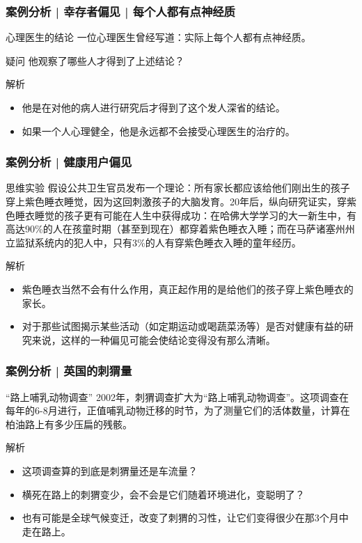 \begin{frame}
  \frametitle{案例分析 | 幸存者偏见 | 每个人都有点神经质}
  \begin{block}{心理医生的结论}
    一位心理医生曾经写道：实际上每个人都有点神经质。
  \end{block}
  \pause
  \begin{block}{疑问}
    他观察了哪些人才得到了上述结论？
  \end{block}
  \pause
  \begin{block}{解析}
    \begin{itemize}
      \item 他是在对他的病人进行研究后才得到了这个发人深省的结论。
      \item 如果一个人心理健全，他是永远都不会接受心理医生的治疗的。
    \end{itemize}
  \end{block}
\end{frame}

\begin{frame}
  \frametitle{案例分析 | 健康用户偏见}
   \begin{block}{思维实验}
     假设公共卫生官员发布一个理论：所有家长都应该给他们刚出生的孩子穿上紫色睡衣睡觉，因为这回刺激孩子的大脑发育。20年后，纵向研究证实，穿紫色睡衣睡觉的孩子更有可能在人生中获得成功：在哈佛大学学习的大一新生中，有高达90\%的人在孩童时期（甚至到现在）都穿着紫色睡衣入睡；而在马萨诸塞州州立监狱系统内的犯人中，只有3\%的人有穿紫色睡衣入睡的童年经历。
   \end{block} 
   \pause
   \begin{block}{解析}
     \begin{itemize}
       \item 紫色睡衣当然不会有什么作用，真正起作用的是给他们的孩子穿上紫色睡衣的家长。
       \item 对于那些试图揭示某些活动（如定期运动或喝蔬菜汤等）是否对健康有益的研究来说，这样的一种偏见可能会使结论变得没有那么清晰。
     \end{itemize}
   \end{block}
\end{frame}

\begin{frame}
  \frametitle{案例分析 | 英国的刺猬量}
  \begin{block}{“路上哺乳动物调查”}
    2002年，刺猬调查扩大为“路上哺乳动物调查”。这项调查在每年的6-8月进行，正值哺乳动物迁移的时节，为了测量它们的活体数量，计算在柏油路上有多少压扁的残骸。
  \end{block}
  \pause
  \begin{block}{解析}
    \begin{itemize}
      \item 这项调查算的到底是刺猬量还是车流量？
      \item 横死在路上的刺猬变少，会不会是它们随着环境进化，变聪明了？
      \item 也有可能是全球气候变迁，改变了刺猬的习性，让它们变得很少在那3个月中走在路上。
    \end{itemize}
  \end{block}
\end{frame}

